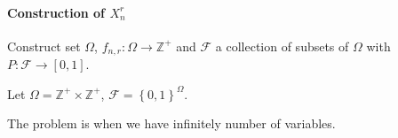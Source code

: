 \paragraph{Construction of $X_n^r$}
Construct set $\Omega$, $f_{n,r}: \Omega \to \mathbb{Z}^+$ and $\mathcal{F}$ a collection of subsets of $\Omega$ with $P: \mathcal{F} \to [0,1]$.

Let $\Omega = \mathbb{Z}^+ \times \mathbb{Z}^+$, $\mathcal{F} = \left\{ 0,1 \right\}^\Omega$. 

The problem is when we have infinitely number of variables.